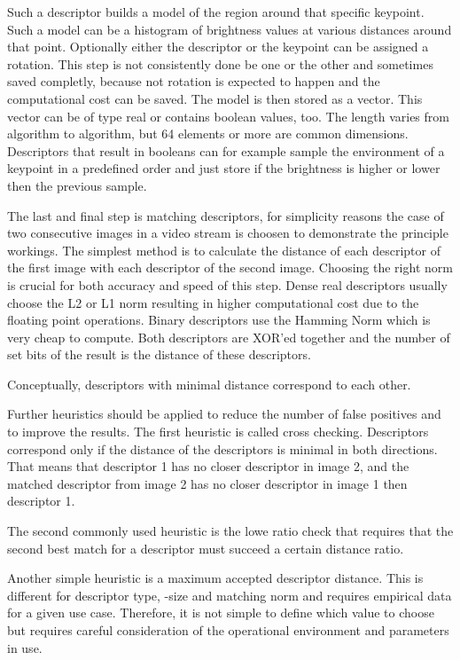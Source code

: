 Such a descriptor builds a model of the region around that specific keypoint.
Such a model can be a histogram of brightness values at various distances around that point.
Optionally either the descriptor or the keypoint can be assigned a rotation.
This step is not consistently done be one or the other and sometimes saved completly, because not rotation is expected to happen and the computational cost can be saved.
The model is then stored as a vector.
This vector can be of type real or contains boolean values, too.
The length varies from algorithm to algorithm, but 64 elements or more are common dimensions.
Descriptors that result in booleans can for example sample the environment of a keypoint in a predefined order and just store if the brightness is higher or lower then the previous sample.

The last and final step is matching descriptors, for simplicity reasons the case of two consecutive images in a video stream is choosen to demonstrate the principle workings.
The simplest method is to calculate the distance of each descriptor of the first image with each descriptor of the second image.
Choosing the right norm is crucial for both accuracy and speed of this step.
Dense real descriptors usually choose the L2 or L1 norm resulting in higher computational cost due to the floating point operations.
Binary descriptors use the Hamming Norm which is very cheap to compute.
Both descriptors are XOR'ed together and the number of set bits of the result is the distance of these descriptors.

Conceptually, descriptors with minimal distance correspond to each other.

Further heuristics should be applied to reduce the number of false positives and to improve the results.
The first heuristic is called cross checking. Descriptors correspond only if the distance of the descriptors is minimal in both directions.
That means that descriptor 1 has no closer descriptor in image 2, and the matched descriptor from image 2 has no closer descriptor in image 1 then descriptor 1.

The second commonly used heuristic is the lowe ratio check\cite{lowe_ijcv2004} that requires that the second best match for a descriptor must succeed a certain distance ratio.

Another simple heuristic is a maximum accepted descriptor distance.
This is different for descriptor type, -size and matching norm and requires empirical data for a given use case.
Therefore, it is not simple to define which value to choose but requires careful consideration of the operational environment and parameters in use.

